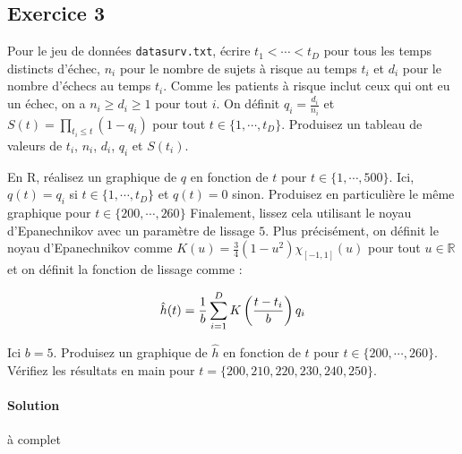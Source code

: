 \documentclass[../main.tex]{subfiles}
\begin{document}
\begin{CJK*}{UTF8}{gbsn}
\section*{Exercice 3}
Pour le jeu de données 
\texttt{datasurv.txt}, 
écrire $t_1 < \cdots < t_D$ pour tous les temps distincts d'échec, 
$n_i$ pour le nombre de sujets à risque au temps $t_i$
et $d_i$ pour le nombre d'échecs au temps $t_i$.
Comme les patients à risque inclut ceux qui ont eu un échec,
on a $n_i \geqslant d_i \geqslant 1$ pour tout $i$.
On définit $q_i = \frac{d_i}{n_i}$ et $S(t) = \prod_{t_i \leqslant t} (1 - q_i)$
pour tout $t \in \{1, \cdots, t_D\}$.
Produisez un tableau de valeurs de $t_i$, $n_i$, $d_i$, $q_i$ et $S(t_i)$.

En R, réalisez un graphique de $q$ en fonction de $t$ pour $t \in \{1, \cdots, 500\}$.
Ici, $q(t) = q_i$ si $t \in \{1, \cdots, t_D\}$ et $q(t) = 0$ sinon.
Produisez en particulière le même graphique pour $t \in \{200, \cdots, 260\}$
Finalement, lissez cela utilisant le noyau d'Epanechnikov avec un paramètre de lissage $5$.
Plus précisément, on définit le noyau d'Epanechnikov comme $K(u) = \frac{3}{4}(1-u^2)\chi_{[-1,1]}(u)$
pour tout $u \in \mathbb{R}$ et on définit la fonction de lissage comme :

\begin{equation*}
    \hat{h}(t) = \frac{1}{b} \sum_{i=1}^D K\left ( \frac{t-t_i}{b} \right ) q_i
\end{equation*}

Ici $b = 5$. 
Produisez un graphique de $\hat{h}$ en fonction de $t$ pour $t \in \{200, \cdots, 260\}$.
Vérifiez les résultats en main pour $t = \{200, 210, 220, 230, 240, 250\}$.

\paragraph{Solution}

à complet

\end{CJK*}
\end{document}
